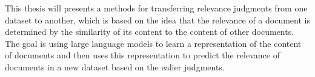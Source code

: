 This thesis will presents a methods for transferring relevance judgments from one dataset to another, which is based on the idea that the relevance of a document is determined by the similarity of its content to the content of other documents. The goal is using large language models to learn a representation of the content of documents and then uses this representation to predict the relevance of documents in a new dataset based on the ealier judgments.